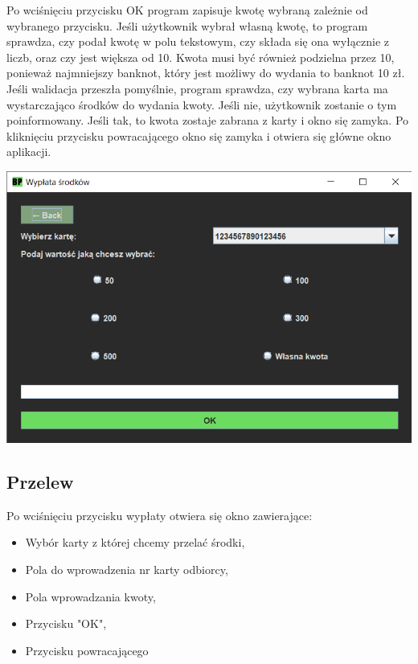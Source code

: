 \documentclass[12pt, letterpaper]{article}
\begin{document}
\quad Po wciśnięciu przycisku OK program zapisuje kwotę wybraną zależnie od wybranego przycisku. Jeśli użytkownik wybrał własną kwotę, to program sprawdza, czy podał kwotę w polu tekstowym, czy składa się ona wyłącznie z liczb, oraz czy jest większa od 10.
Kwota musi być również podzielna przez 10, ponieważ najmniejszy banknot, który jest możliwy do wydania to banknot 10 zł. 
Jeśli walidacja przeszła pomyślnie, program sprawdza, czy wybrana karta ma wystarczająco środków do wydania kwoty. Jeśli nie, użytkownik zostanie o tym poinformowany. Jeśli tak, to kwota zostaje zabrana z karty i okno się zamyka.
Po kliknięciu przycisku powracającego okno się zamyka i otwiera się główne okno aplikacji.

\begin{center}
	\includegraphics[scale=0.6]{wyplata}
\end{center}

\newpage

\subsection{Przelew}

\quad Po wciśnięciu przycisku wypłaty otwiera się okno zawierające:

\begin{itemize}
\item Wybór karty z której chcemy przelać środki,
\item Pola do wprowadzenia nr karty odbiorcy,
\item Pola wprowadzania kwoty,
\item Przycisku "OK",
\item Przycisku powracającego
\end{itemize}
\end{document}
